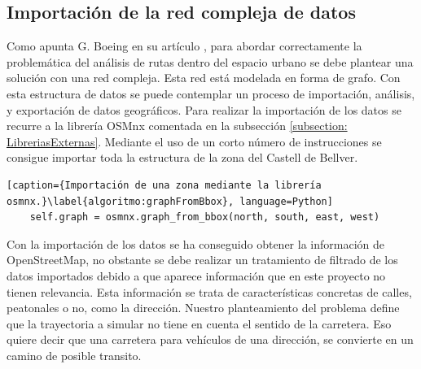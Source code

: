 \subsection{Importación de la red compleja de datos}
\label{section: EstructuraLogica}
Como apunta G. Boeing en su artículo \cite{Boeing01}  , para abordar correctamente la 
problemática del análisis de rutas dentro del espacio urbano se debe plantear una solución con 
una red compleja. 
Esta red está modelada en forma de grafo. Con esta estructura de datos se puede contemplar un 
proceso de importación, análisis, y exportación de datos geográficos. Para realizar la importación 
de los datos se recurre a la librería OSMnx comentada en la subsección \ref{subsection: 
LibreriasExternas}. Mediante el uso de un corto número de instrucciones se consigue importar 
toda la estructura de la zona del Castell de Bellver.
\begin{lstlisting}[caption={Importación de una zona mediante la librería osmnx.}\label{algoritmo:graphFromBbox}, language=Python] 
	self.graph = osmnx.graph_from_bbox(north, south, east, west)
\end{lstlisting}


Con la importación de los datos se ha conseguido obtener la información de OpenStreetMap, 
no obstante se debe realizar un tratamiento de filtrado de los datos importados debido a que 
aparece información que en este proyecto no tienen relevancia. Esta información se trata de 
características concretas de calles, peatonales o no, como la dirección. Nuestro planteamiento del 
problema define que la trayectoria a simular no tiene en cuenta el sentido de la carretera. Eso 
quiere decir que una carretera para vehículos de una dirección, se convierte en un camino de 
posible transito. 

